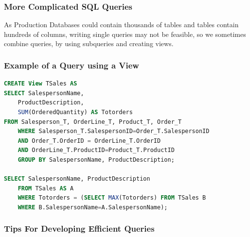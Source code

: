 \documentclass[12pt]{article}
\begin{document}
\subsubsection{More Complicated SQL Queries}

As Production Databases could contain thousands of tables and tables contain hundreds of columns, writing single queries may not be feasible, so we sometimes combine queries, by using subqueries and creating views.

\subsubsection{Example of a Query using a View}

\begin{lstlisting}[language=SQL]
CREATE View TSales AS
SELECT SalespersonName,
	ProductDescription,
	SUM(OrderedQuantity) AS Totorders
FROM Salesperson_T, OrderLine_T, Product_T, Order_T
	WHERE Salesperson_T.SalespersonID=Order_T.SalespersonID
	AND Order_T.OrderID = OrderLine_T.OrderID
	AND OrderLine_T.ProductID=Product_T.ProductID
	GROUP BY SalespersonName, ProductDescription;
	
SELECT SalespersonName, ProductDescription
	FROM TSales AS A
	WHERE Totorders = (SELECT MAX(Totorders) FROM TSales B
	WHERE B.SalespersonName=A.SalespersonName);
\end{lstlisting}

\subsubsection{Tips For Developing Efficient Queries}
\end{document}
